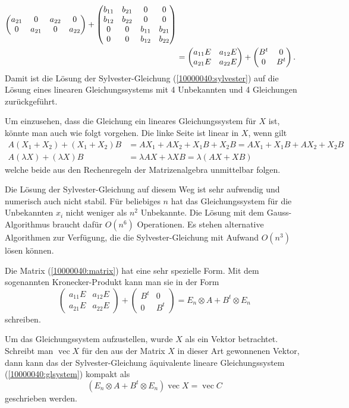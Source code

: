 \begin{loesung}
\begin{align}
\begin{pmatrix}
a_{21}&     0&a_{22}&     0\\
     0&a_{21}&     0&a_{22}
\end{pmatrix}
+
\begin{pmatrix}
b_{11}&b_{21}&     0&     0\\
b_{12}&b_{22}&     0&     0\\
     0&     0&b_{11}&b_{21}\\
     0&     0&b_{12}&b_{22}
\end{pmatrix}
\notag
\\
&=
\begin{pmatrix}
a_{11}E&a_{12}E\\
a_{21}E&a_{22}E
\end{pmatrix}
+
\begin{pmatrix}
B^t&0\\
0&B^t
\end{pmatrix}.
\label{10000040:matrix}
\end{align}
Damit ist die Lösung der Sylvester-Gleichung (\ref{10000040:sylvester}) auf 
die Lösung eines linearen Gleichungssystems mit 4 Unbekannten und 4 Gleichungen
zurückgeführt.

Um einzusehen, dass die Gleichung ein lineares Gleichungssystem für $X$ ist,
könnte man auch wie folgt vorgehen.
Die linke Seite ist linear in $X$, wenn gilt
\begin{align*}
A(X_1+X_2)+(X_1+X_2)B&=AX_1+AX_2+X_1B+X_2B=AX_1+X_1B + AX_2+X_2B\\
A(\lambda X)+(\lambda X)B&=\lambda AX+\lambda XB=\lambda(AX+XB)
\end{align*}
welche beide aus den Rechenregeln der Matrizenalgebra unmittelbar folgen.
\end{loesung}

\begin{diskussion}
Die Lösung der Sylvester-Gleichung auf diesem Weg ist sehr aufwendig und
numerisch auch nicht stabil. 
Für beliebiges $n$ hat das Gleichungssystem für die Unbekannten $x_i$ 
nicht weniger als $n^2$ Unbekannte.
Die Lösung mit dem Gauss-Algorithmus braucht dafür $O(n^6)$ Operationen.
Es stehen alternative Algorithmen zur Verfügung, die die Sylvester-Gleichung
mit Aufwand $O(n^3)$ lösen können.

Die Matrix (\ref{10000040:matrix}) hat eine sehr spezielle Form.
Mit dem sogenannten Kronecker-Produkt kann man sie in der Form
\[
\begin{pmatrix}
a_{11}E&a_{12}E\\
a_{21}E&a_{22}E
\end{pmatrix}
+
\begin{pmatrix}
B^t&0\\
0&B^t
\end{pmatrix}
=
E_n \otimes A
+
B^t \otimes E_n
\]
schreiben.

Um das Gleichungssystem aufzustellen, wurde $X$ als ein Vektor betrachtet.
Schreibt man $\operatorname{vec}X$ für den aus der Matrix $X$ in dieser Art
gewonnenen Vektor, dann kann das der Sylvester-Gleichung äquivalente
lineare Gleichungssystem (\ref{10000040:glsystem}) kompakt als
\[
(E_n \otimes A
+
B^t \otimes E_n)\operatorname{vec}X
=
\operatorname{vec}C
\]
geschrieben werden.
\end{diskussion}


